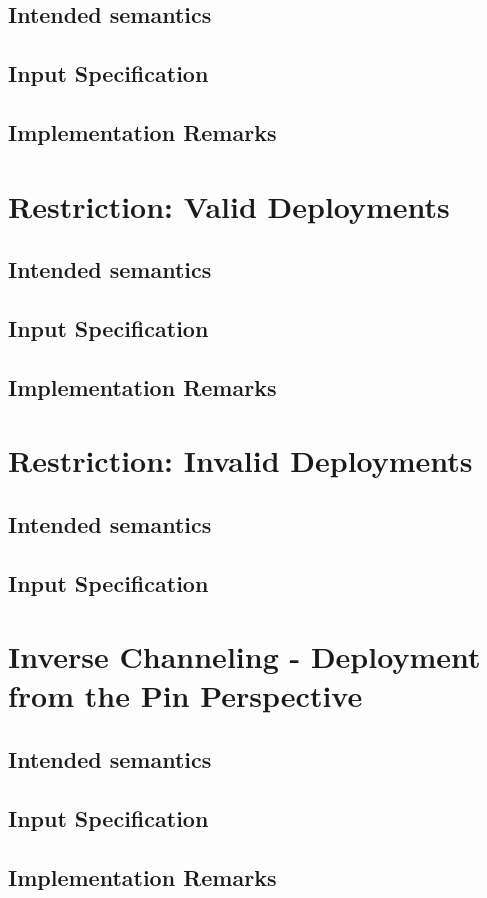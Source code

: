 \subsection{Intended semantics}

\subsection{Input Specification}

\subsection{Implementation Remarks}

\section{Restriction: Valid Deployments}

\subsection{Intended semantics}

\subsection{Input Specification}

\subsection{Implementation Remarks}

\section{Restriction: Invalid Deployments}

\subsection{Intended semantics}

\subsection{Input Specification}

\section{Inverse Channeling - Deployment from the Pin Perspective}

\subsection{Intended semantics}

\subsection{Input Specification}

\subsection{Implementation Remarks}


